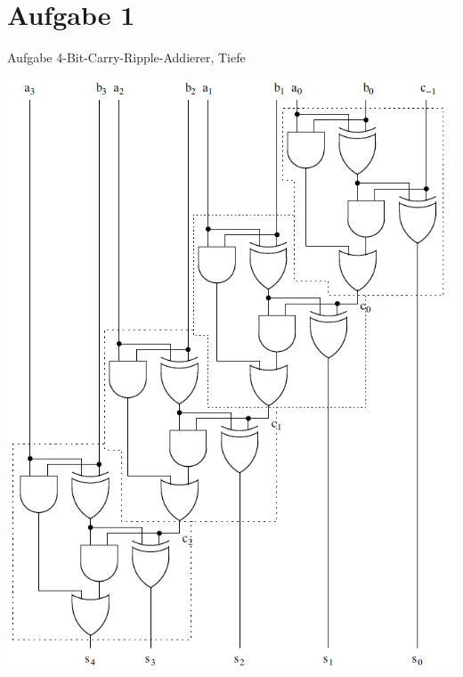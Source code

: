 
\section{Aufgabe 1}

\setcounter{exercise}{1}

\begin{frame}[allowframebreaks]{Aufgabe \thesection}{4-Bit-Carry-Ripple-Addierer, Tiefe}

\begin{solution}
    \includegraphics[height=0.5\paperheight, center]{content/CRA.png}
\end{solution}


\end{frame}
